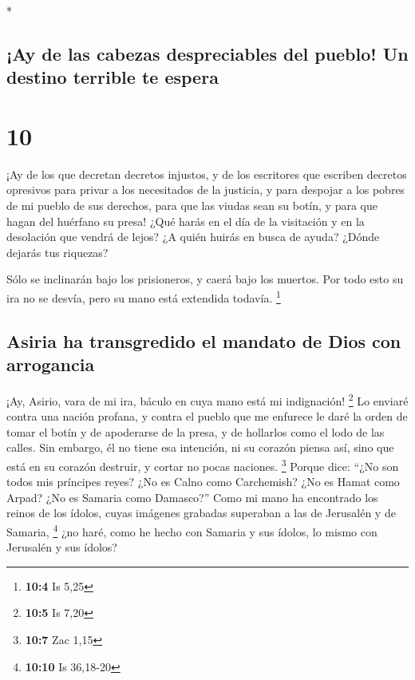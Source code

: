\begin{paracol}{2}
\begin{otherlanguage}{english}
\end{otherlanguage}

\switchcolumn[0]*

\hypertarget{ay-de-las-cabezas-despreciables-del-pueblo-un-destino-terrible-te-espera}{%
\subsection{¡Ay de las cabezas despreciables del pueblo! Un destino
terrible te
espera}\label{ay-de-las-cabezas-despreciables-del-pueblo-un-destino-terrible-te-espera}}

\hypertarget{section-18}{%
\section{10}\label{section-18}}

 ¡Ay de los que decretan decretos injustos, y de los
escritores que escriben decretos opresivos  para privar a
los necesitados de la justicia, y para despojar a los pobres de mi
pueblo de sus derechos, para que las viudas sean su botín, y para que
hagan del huérfano su presa!  ¿Qué harás en el día de la
visitación y en la desolación que vendrá de lejos? ¿A quién huirás en
busca de ayuda? ¿Dónde dejarás tus riquezas?

 Sólo se inclinarán bajo los prisioneros, y caerá bajo los
muertos. Por todo esto su ira no se desvía, pero su mano está extendida
todavía. \footnote{\textbf{10:4} Is 5,25}

\hypertarget{asiria-ha-transgredido-el-mandato-de-dios-con-arrogancia}{%
\subsection{Asiria ha transgredido el mandato de Dios con
arrogancia}\label{asiria-ha-transgredido-el-mandato-de-dios-con-arrogancia}}

 ¡Ay, Asirio, vara de mi ira, báculo en cuya mano está mi
indignación! \footnote{\textbf{10:5} Is 7,20}  Lo enviaré
contra una nación profana, y contra el pueblo que me enfurece le daré la
orden de tomar el botín y de apoderarse de la presa, y de hollarlos como
el lodo de las calles.  Sin embargo, él no tiene esa
intención, ni su corazón piensa así, sino que está en su corazón
destruir, y cortar no pocas naciones. \footnote{\textbf{10:7} Zac 1,15}
 Porque dice: ``¿No son todos mis príncipes reyes?
 ¿No es Calno como Carchemish? ¿No es Hamat como Arpad?
¿No es Samaria como Damasco?''  Como mi mano ha
encontrado los reinos de los ídolos, cuyas imágenes grabadas superaban a
las de Jerusalén y de Samaria, \footnote{\textbf{10:10} Is 36,18-20}
 ¿no haré, como he hecho con Samaria y sus ídolos, lo
mismo con Jerusalén y sus ídolos?


\end{paracol}
